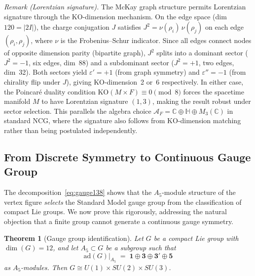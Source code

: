 \documentclass[12pt,a4paper]{article}
\newtheorem{theorem}{Theorem}
\theoremstyle{definition}
\begin{document}
\noindent\textit{Remark (Lorentzian signature).}  The McKay graph structure permits Lorentzian signature through the KO-dimension mechanism.  On the edge space (dim~$120 = |2I|$), the charge conjugation $J$ satisfies $J^2 = \nu(\rho_i)\,\nu(\rho_j)$ on each edge $(\rho_i, \rho_j)$, where $\nu$ is the Frobenius--Schur indicator.  Since all edges connect nodes of opposite dimension parity (bipartite graph), $J^2$ splits into a dominant sector ($J^2 = -1$, six edges, dim~88) and a subdominant sector ($J^2 = +1$, two edges, dim~32).  Both sectors yield $\varepsilon' = +1$ (from graph symmetry) and $\varepsilon'' = -1$ (from chirality flip under $J$), giving KO-dimension~2 or~6 respectively.  In either case, the Poincar\'e duality condition $\mathrm{KO}(M \times F) \equiv 0\pmod{8}$ forces the spacetime manifold $M$ to have Lorentzian signature $(1,3)$, making the result robust under sector selection.  This parallels the algebra choice $\mathcal{A}_F = \mathbb{C} \oplus \mathbb{H} \oplus M_3(\mathbb{C})$ in standard NCG, where the signature also follows from KO-dimension matching rather than being postulated independently.

\subsection{From Discrete Symmetry to Continuous Gauge Group}
\label{sec:discrete_continuous}

The decomposition~\eqref{eq:gauge138} shows that the $A_5$-module structure of the vertex figure \emph{selects} the Standard Model gauge group from the classification of compact Lie groups.  We now prove this rigorously, addressing the natural objection that a finite group cannot generate a continuous gauge symmetry.

\begin{theorem}[Gauge group identification]\label{thm:gauge_id}
Let $G$ be a compact Lie group with $\dim(G) = 12$, and let $A_5 \subset G$ be a subgroup such that
\begin{equation}
\mathrm{ad}(G)\big|_{A_5} \;=\; \mathbf{1} \oplus \mathbf{3} \oplus \mathbf{3'} \oplus \mathbf{5}
\label{eq:adjoint_constraint}
\end{equation}
as $A_5$-modules.  Then $G \cong U(1) \times SU(2) \times SU(3)$.
\end{theorem}
\end{document}
